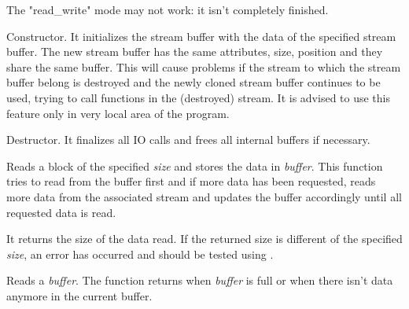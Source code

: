 
The "read\_write" mode may not work: it isn't completely finished.


Constructor. It initializes the stream buffer with the data of the specified
stream buffer. The new stream buffer has the same attributes, size, position
and they share the same buffer. This will cause problems if the stream to
which the stream buffer belong is destroyed and the newly cloned stream
buffer continues to be used, trying to call functions in the (destroyed)
stream. It is advised to use this feature only in very local area of the
program.





Destructor. It finalizes all IO calls and frees all internal buffers if
necessary.

\label{wxstreambufferread}


Reads a block of the specified {\it size} and stores the data in {\it buffer}.
This function tries to read from the buffer first and if more data has been
requested, reads more data from the associated stream and updates the buffer
accordingly until all requested data is read.


It returns the size of the data read. If the returned size is different of the specified 
{\it size}, an error has occurred and should be tested using 
.


Reads a {\it buffer}. The function returns when {\it buffer} is full or when there isn't
data anymore in the current buffer.



\label{wxstreambufferwrite}

